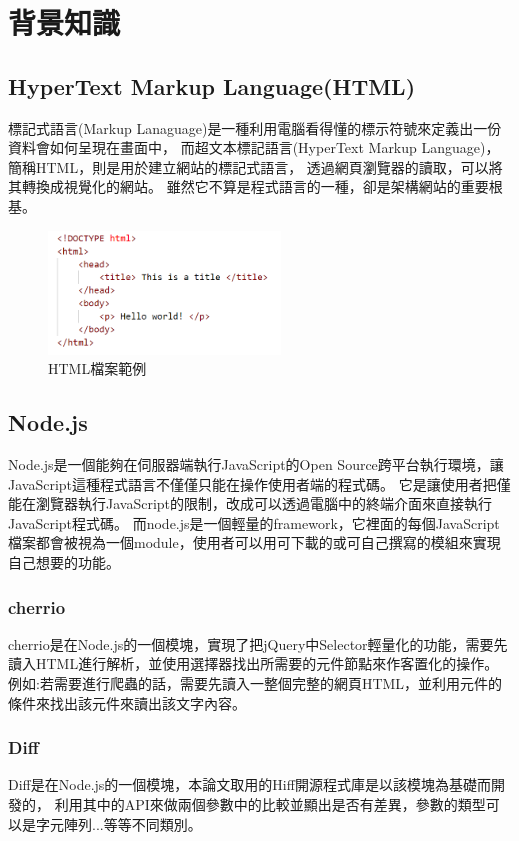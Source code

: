\chapter{背景知識}

\section{HyperText Markup Language(HTML)}\label{s2.1}
\indent
標記式語言(Markup Lanaguage)\cite{HTML}是一種利用電腦看得懂的標示符號來定義出一份資料會如何呈現在畫面中，
而超文本標記語言(HyperText Markup Language)，簡稱HTML，則是用於建立網站的標記式語言，
透過網頁瀏覽器的讀取，可以將其轉換成視覺化的網站。
雖然它不算是程式語言的一種，卻是架構網站的重要根基。

\begin{figure}[H]
    \centering
    \includegraphics[width=0.55\textwidth]{picture/ch2-htmlExample.png}
    \caption{HTML檔案範例}
    \label{f2.1}
\end{figure}

\section{Node.js}\label{s2.2}
Node.js\cite{Node.js}是一個能夠在伺服器端執行JavaScript的Open Source跨平台執行環境，讓JavaScript這種程式語言不僅僅只能在操作使用者端的程式碼。
它是讓使用者把僅能在瀏覽器執行JavaScript的限制，改成可以透過電腦中的終端介面來直接執行JavaScript程式碼。
而node.js是一個輕量的framework，它裡面的每個JavaScript檔案都會被視為一個module，使用者可以用可下載的或可自己撰寫的模組來實現自己想要的功能。

\subsection{cherrio}\label{s2.2.1}
cherrio是在Node.js的一個模塊，實現了把jQuery中Selector輕量化的功能，需要先讀入HTML進行解析，並使用選擇器找出所需要的元件節點來作客置化的操作。
例如:若需要進行爬蟲的話，需要先讀入一整個完整的網頁HTML，並利用元件的條件來找出該元件來讀出該文字內容。

\subsection{Diff}\label{s2.2.2}
Diff是在Node.js的一個模塊，本論文取用的Hiff開源程式庫\cite{Hiff}是以該模塊為基礎而開發的，
利用其中的API來做兩個參數中的比較並顯出是否有差異，參數的類型可以是字元陣列...等等不同類別。


